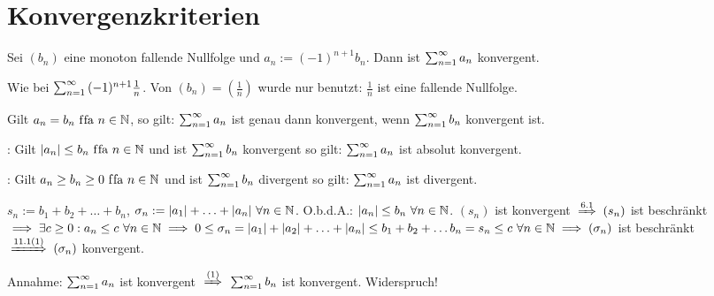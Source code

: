 \documentclass[a4paper,twoside,DIV15,BCOR12mm]{scrbook}
\begin{document}
\chapter{Konvergenzkriterien}

\begin{satz}[Leibnizkriterium]
Sei $(b_n)$ eine monoton fallende Nullfolge und $a_n := (-1)^{n+1}b_n$. Dann ist $\sum_{n=1}^{\infty}{a_n}$ konvergent.
\end{satz}
\begin{beweis}
Wie bei $\sum_{n=1}^{\infty}{(-1)^{n+1}\frac{1}{n}}$. Von $(b_n)=(\frac{1}{n})$ wurde nur benutzt: $\frac{1}{n}$ ist eine fallende Nullfolge.
\end{beweis}
\begin{bemerkung}
Gilt $a_n=b_n \text{ f\/fa } n\in\mathbb{N}$, so gilt: $\sum_{n=1}^{\infty}{a_n}$ ist genau dann konvergent, wenn $\sum_{n=1}^{\infty}{b_n}$ konvergent ist.
\end{bemerkung}

\begin{satz}
\begin{liste}
\item {}: Gilt $|a_n|\le b_n \text{ f\/fa } n\in\mathbb{N}$ und  ist $\sum_{n=1}^{\infty}{b_n}$ konvergent so gilt: $\sum_{n=1}^{\infty}{a_n}$ ist absolut konvergent.
\item {}: Gilt $a_n\ge b_n \ge 0 \text{ f\/fa } n\in\mathbb{N}$ und  ist $\sum_{n=1}^{\infty}{b_n}$ divergent so gilt: $\sum_{n=1}^{\infty}{a_n}$ ist divergent.
\end{liste}
\end{satz}

\begin{beweise}
\item $s_n := b_1 +b_2+ \ldots + b_n$, $\sigma_n := |a_1|+\ldots+|a_n| \ \forall n\in\mathbb{N}$. O.b.d.A.: $|a_n| \le b_n \ \forall n\in\MdN$. $(s_n)$ ist konvergent $\folgtnach{6.1} (s_n)$ ist beschränkt $\implies \exists c\ge0: a_n \le c \ \forall n\in\mathbb{N} \implies 0 \le \sigma_n = |a_1| + |a_2| + \ldots + |a_n| \le b_1 + b_2 + \ldots b_n = s_n \le c \ \forall n\in\mathbb{N} \implies (\sigma_n)$ ist beschränkt $\folgtnach{11.1(1)} (\sigma_n)$ konvergent.
\item Annahme: $\sum_{n=1}^{\infty}{a_n}$ ist konvergent $\folgtnach{(1)}$ $\sum_{n=1}^{\infty}{b_n}$ ist konvergent. Widerspruch!
\end{beweise}
\end{document}
